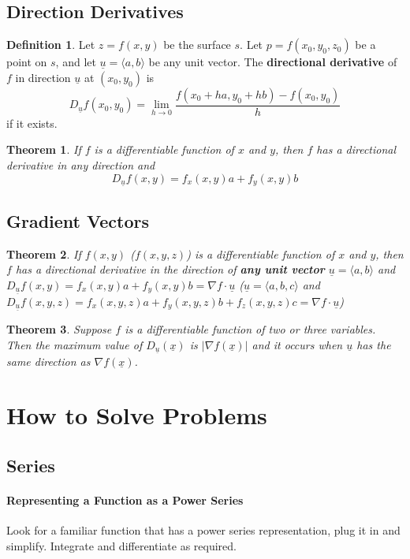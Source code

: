 \documentclass[12 pt]{article}
\newtheorem{thm}{Theorem}
\theoremstyle{definition}
\newtheorem{defn}{Definition}
\begin{document}
\subsection{Direction Derivatives}
\begin{defn}
  Let $z=f(x,y)$ be the surface $s$. Let $p=f(x_0,y_0,z_0)$ be a point on $s$, and let $\underline{u}=\langle a, b \rangle $ be any unit vector. The \textbf{directional derivative} of $f$ in direction $\underline{u}$ at $(x_0,y_0)$ is
  $$D_{\underline{u}}f(x_0,y_0)=\lim_{h \to 0}\frac{f(x_0+ha,y_0+hb)-f(x_0,y_0)}{h}$$ if it exists.

\end{defn}
\begin{thm}
  If $f$ is a differentiable function of $x$ and $y$, then $f$ has a directional derivative in any direction and
  $$ D_{\underline{u}}f(x,y)=f_x(x,y)a+f_y(x,y)b$$
\end{thm}
\subsection{Gradient Vectors}
\begin{thm}
  If ${f(x,y)}$ ($f(x,y,z)$) is a differentiable function of $x$ and $y$, then $f$ has a directional derivative in the direction of \textbf{any unit vector} $\underline{u}=\langle a, b \rangle$ and $D_{\underline{u}}f(x,y)=f_x(x,y)a+f_y(x,y)b=\nabla f \cdot \underline{u}$ ($\underline{u}=\langle a, b, c \rangle$ and $D_{\underline{u}}f(x,y,z)=f_x(x,y,z)a+f_y(x,y,z)b+f_z(x,y,z)c = \nabla f \cdot \underline{u}$)
\end{thm}
\begin{thm}
  Suppose $f$ is a differentiable function of two or three variables. Then the maximum value of $D_{\underline{u}}(\underline{x})$ is $|\nabla f(\underline{x})|$ and it occurs when $\underline{u}$ has the same direction as $\nabla f(\underline{x})$.
\end{thm}
\section{How to Solve Problems}
\subsection{Series}
\paragraph{Representing a Function as a Power Series} Look for a familiar function that has a power series representation, plug it in and simplify. Integrate and differentiate as required.
\end{document}
